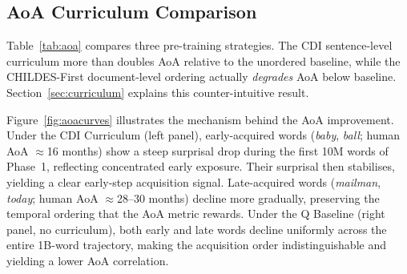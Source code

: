 \documentclass[11pt]{article}
\begin{document}
\begin{table}[t]
\centering
\small
\setlength{\tabcolsep}{4pt}
\caption{Entity tracking per-scenario accuracy (\%).}
\label{tab:entity}
\end{table}

\subsection{AoA Curriculum Comparison}

Table~\ref{tab:aoa} compares three pre-training strategies.
The CDI sentence-level curriculum more than doubles AoA relative to
the unordered baseline, while the CHILDES-First document-level
ordering actually \emph{degrades} AoA below baseline.
Section~\ref{sec:curriculum} explains this counter-intuitive result.

\begin{table}[t]
\centering
\small
{}
\caption{Effect of pre-training curriculum on AoA and Entity accuracy.
Entity scores are measured before SimPER post-training.}
\label{tab:aoa}
\end{table}

Figure~\ref{fig:aoacurves} illustrates the mechanism behind the AoA
improvement.
Under the CDI Curriculum (left panel), early-acquired words
(\emph{baby}, \emph{ball}; human AoA $\approx$16 months)
show a steep surprisal drop during the first 10M words of
Phase~1, reflecting concentrated early exposure.
Their surprisal then stabilises, yielding a clear
early-step acquisition signal.
Late-acquired words (\emph{mailman}, \emph{today}; human
AoA $\approx$28--30 months) decline more gradually,
preserving the temporal ordering that the AoA metric rewards.
Under the Q Baseline (right panel, no curriculum),
both early and late words decline uniformly across the
entire 1B-word trajectory, making the acquisition order
indistinguishable and yielding a lower AoA correlation.
\end{document}

